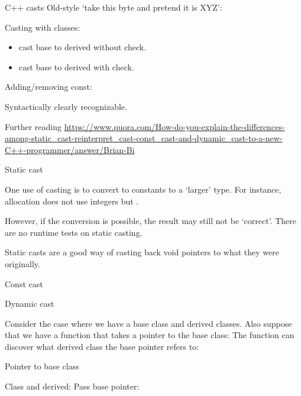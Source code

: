 \begin{slide}{C++ casts}
  \label{sl:cpp-casts}
  Old-style `take this byte and pretend it is XYZ':
  
  Casting with classes:
  \begin{itemize}
  \item {} cast base to derived without check.
  \item {} cast base to derived with check.
  \end{itemize}
  Adding/removing const: 

  Syntactically clearly recognizable.
\end{slide}

Further reading \url{https://www.quora.com/How-do-you-explain-the-differences-among-static_cast-reinterpret_cast-const_cast-and-dynamic_cast-to-a-new-C++-programmer/answer/Brian-Bi}

 {Static cast}

One use of casting is to convert to constants to a `larger' type. For
instance, allocation does not use integers but .


However, if the
conversion is possible, the result may still not be `correct'.
%
%
There are no runtime tests on static casting.

Static casts are a good way of casting back void pointers to what they
were originally.

\begin{slide}{Const cast}
  \label{sl:const-cast}
\end{slide}

 {Dynamic cast}

Consider the case where we have a base class and derived classes.
%
%
Also suppose that we have a function that takes a pointer to the base
class:
%
%
The function can discover what derived class the base pointer refers
to:
%

\begin{slide}{Pointer to base class}
  \label{sl:dyn-base-ptr}
  \begin{multicols}{2}
    Class and derived:
    \vfill\columnbreak
    Pass base pointer:
    \vfill\hbox{}
  \end{multicols}
\end{slide}

